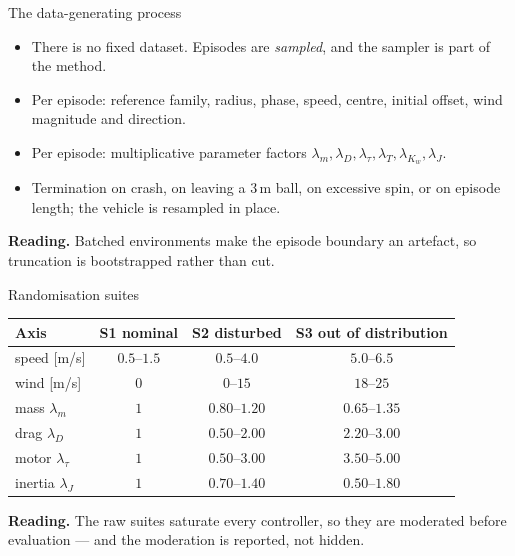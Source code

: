 \documentclass[10pt]{beamer}
\newcommand{\takeaway}[1]{\par\vfill{\footnotesize\textbf{Reading.} #1\par}}
\begin{document}
\begin{frame}{The data-generating process}
  \begin{itemize}
    \item There is no fixed dataset. Episodes are \emph{sampled}, and the
      sampler is part of the method.
    \item Per episode: reference family, radius, phase, speed, centre, initial
      offset, wind magnitude and direction.
    \item Per episode: multiplicative parameter factors
      $\lambda_m,\lambda_D,\lambda_\tau,\lambda_T,\lambda_{K_w},\lambda_J$.
    \item Termination on crash, on leaving a $3\,$m ball, on excessive spin,
      or on episode length; the vehicle is resampled in place.
  \end{itemize}
  \takeaway{Batched environments make the episode boundary an artefact, so
    truncation is bootstrapped rather than cut.}
\end{frame}

\begin{frame}{Randomisation suites}
  \begin{table}
    \centering
    \small
    \begin{tabular}{lccc}
      \toprule
      Axis & S1 nominal & S2 disturbed & S3 out of distribution \\
      \midrule
      speed [m/s]      & $0.5$--$1.5$ & $0.5$--$4.0$ & $5.0$--$6.5$ \\
      wind [m/s]       & $0$          & $0$--$15$    & $18$--$25$ \\
      mass $\lambda_m$ & $1$          & $0.80$--$1.20$ & $0.65$--$1.35$ \\
      drag $\lambda_D$ & $1$          & $0.50$--$2.00$ & $2.20$--$3.00$ \\
      motor $\lambda_\tau$ & $1$      & $0.50$--$3.00$ & $3.50$--$5.00$ \\
      inertia $\lambda_J$ & $1$       & $0.70$--$1.40$ & $0.50$--$1.80$ \\
      \bottomrule
    \end{tabular}
  \end{table}
  \takeaway{The raw suites saturate every controller, so they are moderated
    before evaluation --- and the moderation is reported, not hidden.}
\end{frame}
\end{document}
